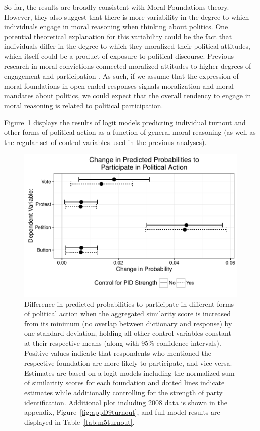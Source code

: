 \documentclass[12pt]{article}
\begin{document}
So far, the results are broadly consistent with Moral Foundations theory. However, they also suggest that there is more variability in the degree to which individuals engage in moral reasoning when thinking about politics. One potential theoretical explanation for this variability could be the fact that individuals differ in the degree to which they moralized their political attitudes, which itself could be a product of exposure to political discourse. Previous research in moral convictions connected moralized attitudes to higher degrees of engagement and participation \citep{skitka2010psychology}. As such, if we assume that the expression of moral foundations in open-ended responses signals moralization and moral mandates about politics, we could expect that the overall tendency to engage in moral reasoning is related to political participation.


Figure~\ref{fig:5turnout} displays the results of logit models predicting individual turnout and other forms of political action as a function of general moral reasoning (as well as the regular set of control variables used in the previous analyses).

\begin{figure}[h]\centering
\includegraphics[scale=.9]{../calc/fig/fig5turnout.pdf}
\caption{Difference in predicted probabilities to participate in different forms of political action when the aggregated similarity score is increased from its minimum (no overlap between dictionary and response) by one standard deviation, holding all other control variables constant at their respective means (along with 95\% confidence intervals). Positive values indicate that respondents who mentioned the respective foundation are more likely to participate, and vice versa. Estimates are based on a logit models including the normalized sum of similaritiy scores for each foundation and dotted lines indicate estimates while additionally controlling for the strength of party identification. Additional plot including 2008 data is shown in the appendix, Figure~\ref{fig:appD9turnout}, and full model results are displayed in Table~\ref{tab:m5turnout}.}\label{fig:5turnout}
\end{figure}
\end{document}
